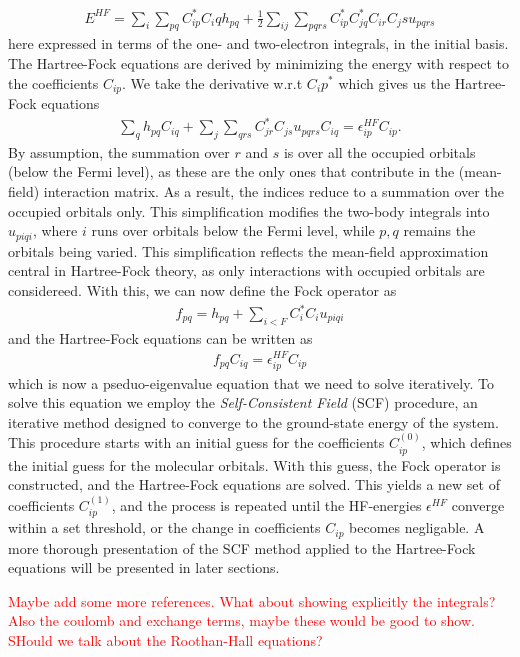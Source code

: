 \documentclass{subfiles}
\begin{document}
\begin{align*}
    E^{HF} = \sum_i\sum_{pq}C^*_{ip}C_{i}qh_{pq} + \frac{1}{2}\sum_{ij}\sum_{pqrs}C^*_{ip}C^*_{jq}C_{ir}C_{j}su_{pqrs}
\end{align*}
here expressed in terms of the one- and two-electron integrals, in the initial basis. The Hartree-Fock equations are derived by minimizing the energy with respect to the coefficients $C_{ip}$. We take the derivative w.r.t $C_{i}p^*$ which gives us the Hartree-Fock equations
\begin{align*}
    \sum_qh_{pq}C_{iq} + \sum_j\sum_{qrs}C^*_{jr}C_{js}u_{pqrs}C_{iq} = \epsilon^{HF}_{ip}C_{ip}.
\end{align*}
By assumption, the summation over $r$ and $s$ is over all the occupied orbitals (below the Fermi level), as these are the only ones that contribute in the (mean-field) interaction matrix. As a result, the indices reduce to a summation over the occupied orbitals only. This simplification modifies the two-body integrals into $u_{piqi}$, where $i$ runs over orbitals below the Fermi level, while $p,q$ remains the orbitals being varied. This simplification reflects the mean-field approximation central in Hartree-Fock theory, as only interactions with occupied orbitals are considereed. With this, we can now define the Fock operator as
\begin{align*}
    f_{pq} = h_{pq} + \sum_{i<F}C^*_{i}C_{i}u_{piqi}
\end{align*}
and the Hartree-Fock equations can be written as
\begin{align}
    f_{pq}C_{iq} = \epsilon^{HF}_{ip}C_{ip}\label{eq:hf_equations}
\end{align}
which is now a pseduo-eigenvalue equation that we need to solve iteratively. To solve this equation we employ the \emph{Self-Consistent Field} (SCF) procedure, an iterative method designed to converge to the ground-state energy of the system. This procedure starts with an initial guess for the coefficients $C_{ip}^{(0)}$, which defines the initial guess for the molecular orbitals. With this guess, the Fock operator is constructed, and the Hartree-Fock equations are solved. This yields a new set of coefficients $C_{ip}^{(1)}$, and the process is repeated until the HF-energies $\epsilon^{HF}$ converge within a set threshold, or the change in coefficients $C_{ip}$ becomes negligable. A more thorough presentation of the SCF method applied to the Hartree-Fock equations will be presented in later sections. 

\textcolor{red}{Maybe add some more references. What about showing explicitly the integrals? Also the coulomb and exchange terms, maybe these would be good to show. SHould we talk about the Roothan-Hall equations?}
\end{document}
